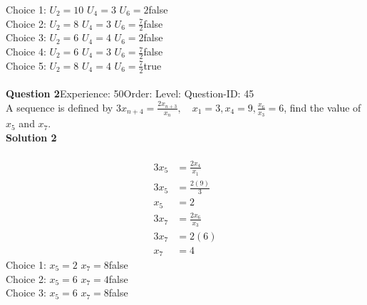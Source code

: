 \documentclass{article}
\begin{document}
Choice 1: \hspace{20pt}$U_2=10 \,\, U_4=3 \,\, U_6=2 $\hspace{20pt}false\\
Choice 2: \hspace{20pt}$U_2=8 \,\, U_4=3 \,\, U_6=\displaystyle\frac{7}{2} $\hspace{20pt}false\\
Choice 3: \hspace{20pt}$U_2=6 \,\, U_4=4 \,\, U_6=2 $\hspace{20pt}false\\
Choice 4: \hspace{20pt}$U_2=6 \,\, U_4=3 \,\, U_6=\displaystyle\frac{7}{2} $\hspace{20pt}false\\
Choice 5: \hspace{20pt}$U_2=8 \,\, U_4=4 \,\, U_6=\displaystyle\frac{7}{2} $\hspace{20pt}true\\
\\[4pt]
\noindent\textbf{Question 2}\hspace{20pt}Experience: 50\hspace{20pt}Order: \hspace{20pt}Level: \hspace{20pt}Question-ID: 45\\[2pt]
A sequence is defined by $3x_{n+4}=\displaystyle\frac{2x_{n+3}}{x_n}, \quad x_1=3,x_4=9, \displaystyle\frac{x_6}{x_3}=6$, find the value of $x_5$ and $x_7$.\\[4pt]
\noindent\textbf{Solution 2}\\[2pt]
\\[-35pt]\begin{align*}
3x_5&=\displaystyle\frac{2x_{4}}{x_1}\\[2pt]
3x_5&=\displaystyle\frac{2(9)}{3}\\[2pt]
x_5&=2\\[12pt]
3x_7&=\displaystyle\frac{2x_6}{x_3}\\[2pt]
3x_7&=2(6)\\[2pt]
x_7&=4
\end{align*}
Choice 1: \hspace{20pt}$x_5=2 \,\, x_7=8$\hspace{20pt}false\\
Choice 2: \hspace{20pt}$x_5=6 \,\, x_7=4$\hspace{20pt}false\\
Choice 3: \hspace{20pt}$x_5=6 \,\, x_7=8$\hspace{20pt}false\\
\end{document}
